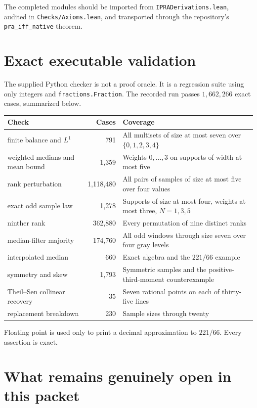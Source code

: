 \documentclass[11pt]{article}
\begin{document}
The completed modules should be imported from
\texttt{IPRADerivations.lean}, audited in \texttt{Checks/Axioms.lean}, and
transported through the repository's \texttt{pra\_iff\_native} theorem.

\section{Exact executable validation}

The supplied Python checker is not a proof oracle.  It is a regression suite
using only integers and \texttt{fractions.Fraction}.  The recorded run passes
$1{,}662{,}266$ exact cases, summarized below.

\begin{longtable}{@{}p{}r p{}@{}}
\toprule
Check & Cases & Coverage\\
\midrule
\endhead
finite balance and $L^1$ & 791 & All multisets of size at most seven over
$\{0,1,2,3,4\}$\\
weighted medians and mean bound & 1,359 & Weights $0,\ldots,3$ on supports of
width at most five\\
rank perturbation & 1,118,480 & All pairs of samples of size at most five over
four values\\
exact odd sample law & 1,278 & Supports of size at most four, weights at most
three, $N=1,3,5$\\
ninther rank & 362,880 & Every permutation of nine distinct ranks\\
median-filter majority & 174,760 & All odd windows through size seven over four
gray levels\\
interpolated median & 660 & Exact algebra and the $221/66$ example\\
symmetry and skew & 1,793 & Symmetric samples and the positive-third-moment
counterexample\\
Theil--Sen collinear recovery & 35 & Seven rational points on each of thirty-five
lines\\
replacement breakdown & 230 & Sample sizes through twenty\\
\bottomrule
\end{longtable}

Floating point is used only to print a decimal approximation to $221/66$.
Every assertion is exact.

\section{What remains genuinely open in this packet}
\end{document}
